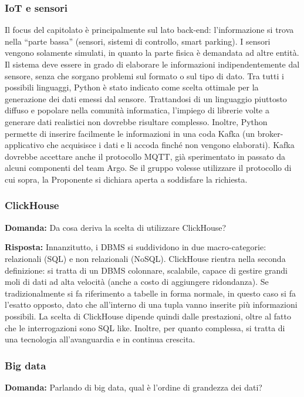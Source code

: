 \subsubsection{IoT e sensori}
Il focus del capitolato è principalmente sul lato back-end: l’informazione si trova nella “parte bassa” (sensori, sistemi di controllo, smart parking). I sensori vengono solamente simulati, in quanto la parte fisica è demandata ad altre entità. Il sistema deve essere in grado di elaborare le informazioni indipendentemente dal sensore, senza che sorgano problemi sul formato o sul tipo di dato. Tra tutti i possibili linguaggi, Python è stato indicato come scelta ottimale per la generazione dei dati emessi dal sensore. Trattandosi di un linguaggio piuttosto diffuso e popolare nella comunità informatica, l’impiego di librerie volte a generare dati realistici non dovrebbe risultare complesso.
Inoltre, Python permette di inserire facilmente le informazioni in una coda Kafka (un broker-applicativo che acquisisce i dati e li accoda finché non vengono elaborati). Kafka dovrebbe accettare anche il protocollo MQTT, già sperimentato in passato da alcuni componenti del team Argo. Se il gruppo volesse utilizzare il protocollo di cui sopra, la Proponente si dichiara aperta a soddisfare la richiesta.

\subsubsection{ClickHouse}
\textbf{Domanda:} Da cosa deriva la scelta di utilizzare ClickHouse?

\textbf{Risposta:} Innanzitutto, i DBMS si suddividono in due macro-categorie: relazionali (SQL) e non relazionali (NoSQL). ClickHouse rientra nella seconda definizione: si tratta di un DBMS colonnare, scalabile, capace di gestire grandi moli di dati ad alta velocità (anche a costo di aggiungere ridondanza). Se tradizionalmente si fa riferimento a tabelle in forma normale, in questo caso si fa l’esatto opposto, dato che all’interno di una tupla vanno inserite più informazioni possibili. La scelta di ClickHouse dipende quindi dalle prestazioni, oltre al fatto che le interrogazioni sono SQL like. Inoltre, per quanto complessa, si tratta di una tecnologia all’avanguardia e in continua crescita.

\subsubsection{Big data}
\textbf{Domanda:} Parlando di big data, qual è l’ordine di grandezza dei dati?

